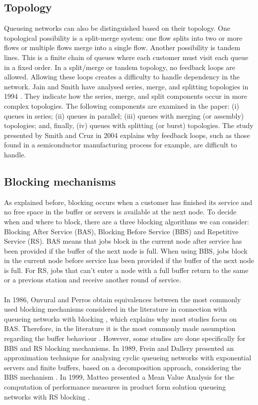 \documentclass[twoside]{article}
\begin{document}
\begin{multicols}{2}
\subsection{\textbf{Topology}}
Queueing networks can also be distinguished based on their topology.
One topological possibility is a split-merge system: one flow splits into two or more flows or multiple flows merge into a single flow. Another possibility is tandem lines. This is a finite chain of queues where each customer must visit each queue in a fixed order. In a split/merge or tandem topology, no feedback loops are allowed. Allowing these loops creates a difficulty to handle dependency in the network.
Jain and Smith have analysed series, merge, and splitting topologies in 1994 \cite{article7}. They indicate how the series, merge, and split components occur in more complex topologies. The following components are examined in the paper: (i) queues in series; (ii) queues in parallel; (iii) queues with merging (or assembly) topologies; and, finally, (iv) queues with splitting (or burst) topologies. The study presented by Smith and Cruz in 2004 \cite{article13} explains why feedback loops, such as those found in a semiconductor manufacturing process for example, are difficult to handle.
\subsection{\textbf{Blocking mechanisms}}
As explained before, blocking occurs when a customer has finished its service and no free space in the buffer or servers is available at the next node. 
To decide when and where to block, there are a three blocking algorithms we can consider: Blocking After Service (BAS), Blocking Before Service (BBS) and Repetitive Service (RS). BAS means that jobs block in the current node after service has been provided if the buffer of the next node is full. When using BBS, jobs block in the current node before service has been provided if the buffer of the next node is full. For RS, jobs that can't enter a node with a full buffer return to the same or a previous station and receive another round of service.\\\\
In 1986, Onvural and Perros obtain equivalences between the most commonly used blocking mechanisms considered in the literature in connection with queueing networks with blocking \cite{compblocks}, which explains why most studies focus on BAS. Therefore, in the literature it is the most commonly made assumption regarding the buffer behaviour \cite{blocking}. However, some studies are done specifically for BBS and RS blocking mechanisms. In 1989, Frein and Dallery presented an approximation technique for analysing cyclic queueing networks with exponential servers and finite buffers, based on a decomposition approach, considering the BBS mechanism \cite{bbs}. In 1999, Matteo presented a Mean Value Analysis for the computation of performance measures in product form solution queueing networks with RS blocking \cite{rs}.


\end{multicols}
\end{document}

